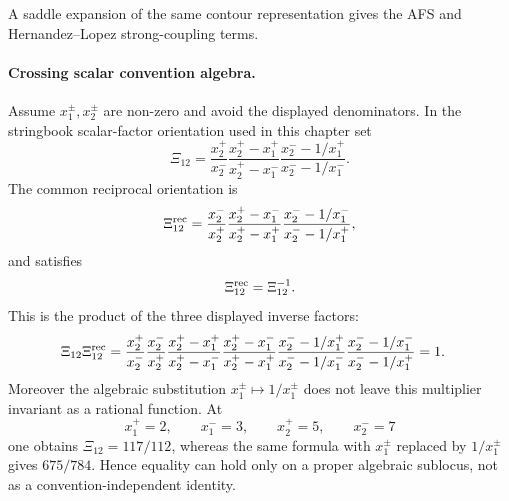 A saddle expansion of the same contour representation gives the AFS and
Hernandez--Lopez strong-coupling terms.

\paragraph{Crossing scalar convention algebra.}
Assume \(x_1^\pm,x_2^\pm\) are non-zero and avoid the displayed
denominators.  In the stringbook scalar-factor orientation used in this
chapter set
\[
  \Xi_{12}
  =
  \frac{x_2^+}{x_2^-}
  \frac{x_2^+ -x_1^+}{x_2^+ -x_1^-}
  \frac{x_2^- -1/x_1^+}{x_2^- -1/x_1^-}.
\]
The common reciprocal orientation is
\[
  \Xi_{12}^{\rm rec}
  =
  \frac{x_2^-}{x_2^+}
  \frac{x_2^+ -x_1^-}{x_2^+ -x_1^+}
  \frac{x_2^- -1/x_1^-}{x_2^- -1/x_1^+},
\]
and satisfies
\[
  \Xi_{12}^{\rm rec}=\Xi_{12}^{-1}.
\]
This is the product of the three displayed inverse factors:
\[
\begin{aligned}
  \Xi_{12}\Xi_{12}^{\rm rec}
  &=
  \frac{x_2^+}{x_2^-}\frac{x_2^-}{x_2^+}
  \frac{x_2^+ -x_1^+}{x_2^+ -x_1^-}
  \frac{x_2^+ -x_1^-}{x_2^+ -x_1^+}
  \frac{x_2^- -1/x_1^+}{x_2^- -1/x_1^-}
  \frac{x_2^- -1/x_1^-}{x_2^- -1/x_1^+}
  =1 .
\end{aligned}
\]
Moreover the algebraic substitution \(x_1^\pm\mapsto1/x_1^\pm\) does not
leave this multiplier invariant as a rational function.  At
\[
  x_1^+=2,\qquad x_1^-=3,\qquad x_2^+=5,\qquad x_2^-=7
\]
one obtains \(\Xi_{12}=117/112\), whereas the same formula with
\(x_1^\pm\) replaced by \(1/x_1^\pm\) gives \(675/784\).  Hence equality can
hold only on a proper algebraic sublocus, not as a convention-independent
identity.

